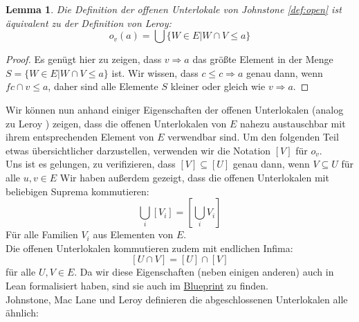 \documentclass{article}
\newtheorem{lemma}[satz]{Lemma}
\begin{document}
\begin{lemma}
    \label{lem:himp_eq}
    Die Definition der offenen Unterlokale von Johnstone \ref{def:open} ist äquivalent zu der Definition von Leroy: 
$$o_v(a) = \bigcup \{ W \in E | W \cap V \le a \}$$
\end{lemma}
\begin{proof}
Es genügt hier zu zeigen, dass $v \Rightarrow a$ das größte Element in der Menge $S = \{ W \in E | W \cap V \le a \}$ ist. 
Wir wissen, dass $c \le c \Rightarrow a$ genau dann, wenn $f c \cap v \le a$, daher sind alle Elemente $S$ kleiner oder gleich wie $v \Rightarrow a$.
\end{proof}
Wir können nun anhand einiger Eigenschaften der offenen Unterlokalen (analog zu Leroy \autocite[S. 10]{leroy_theorie_2013}) zeigen, dass die offenen Unterlokalen von $E$ nahezu austauschbar mit ihrem entsprechenden Element von $E$ verwendbar sind. Um den folgenden Teil etwas übersichtlicher darzustellen, verwenden wir die Notation $[V]$ für $o_v$. \\
Uns ist es gelungen, zu verifizieren, dass $[V] \subseteq [U]$ genau dann, wenn $V \subseteq U$ für alle $u, v \in E$ %
Wir haben außerdem gezeigt, dass die offenen Unterlokalen mit beliebigen Suprema kommutieren: 
$$\bigcup_i [V_i] = [\bigcup_i V_i]$$ %
Für alle Familien $V_i$ aus Elementen von $E$. \\
Die offenen Unterlokalen kommutieren zudem mit endlichen Infima: 
$$[U \cap V] = [U] \cap [V]$$ %
für alle $U, V \in E$. Da wir diese Eigenschaften (neben einigen anderen) auch in Lean formalisiert haben, sind sie auch im \href{https://bergschaf.github.io/leroy/blueprint/sect0004.html#def:open_sublocal}{Blueprint} zu finden. \\
Johnstone, Mac Lane und Leroy definieren die abgeschlossenen Unterlokalen alle ähnlich: 
\end{document}
